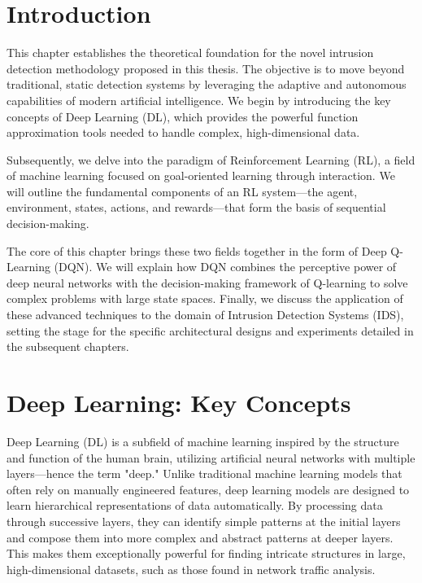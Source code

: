 \documentclass[16pt]{report}
\begin{document}
\section{Introduction}
This chapter establishes the theoretical foundation for the novel intrusion detection methodology proposed in this thesis. The objective is to move beyond traditional, static detection systems by leveraging the adaptive and autonomous capabilities of modern artificial intelligence. We begin by introducing the key concepts of Deep Learning (DL), which provides the powerful function approximation tools needed to handle complex, high-dimensional data.

Subsequently, we delve into the paradigm of Reinforcement Learning (RL), a field of machine learning focused on goal-oriented learning through interaction. We will outline the fundamental components of an RL system—the agent, environment, states, actions, and rewards—that form the basis of sequential decision-making.

The core of this chapter brings these two fields together in the form of Deep Q-Learning (DQN). We will explain how DQN combines the perceptive power of deep neural networks with the decision-making framework of Q-learning to solve complex problems with large state spaces. Finally, we discuss the application of these advanced techniques to the domain of Intrusion Detection Systems (IDS), setting the stage for the specific architectural designs and experiments detailed in the subsequent chapters.

\section{Deep Learning: Key Concepts}
Deep Learning (DL) is a subfield of machine learning inspired by the structure and function of the human brain, utilizing artificial neural networks with multiple layers—hence the term "deep." Unlike traditional machine learning models that often rely on manually engineered features, deep learning models are designed to learn hierarchical representations of data automatically. By processing data through successive layers, they can identify simple patterns at the initial layers and compose them into more complex and abstract patterns at deeper layers. This makes them exceptionally powerful for finding intricate structures in large, high-dimensional datasets, such as those found in network traffic analysis.
\end{document}
